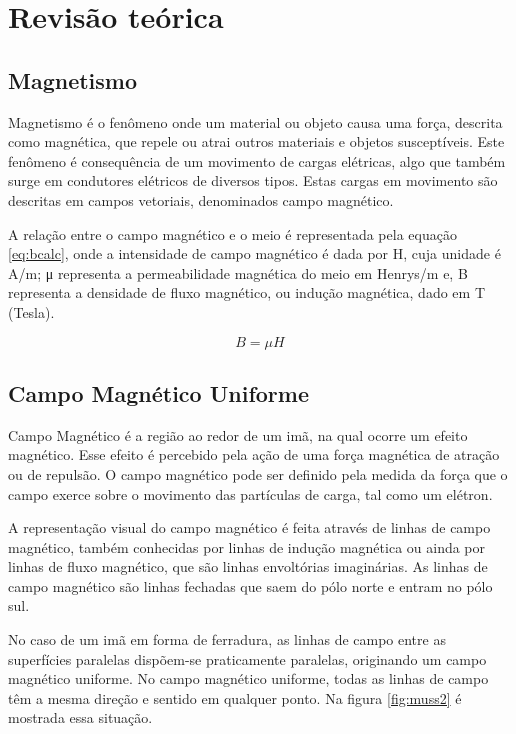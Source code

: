 \chapter{Revisão teórica}



\section{Magnetismo}

Magnetismo é o fenômeno onde um material ou objeto causa uma força,
descrita como magnética, que repele ou atrai outros materiais e objetos susceptíveis. Este fenômeno é consequência de um movimento de cargas elétricas, algo que também surge em condutores elétricos de diversos tipos. Estas cargas em movimento são descritas em campos vetoriais, denominados campo magnético.\cite{callister2010}

A relação entre o campo magnético e o meio é representada pela equação \ref{eq:bcalc}, onde a intensidade de campo magnético é dada por H, cuja unidade é A/m; μ representa a permeabilidade magnética do meio em Henrys/m e, B representa a densidade de fluxo magnético, ou indução magnética, dado em T (Tesla). \cite{callister2010}

\begin{equation}
    B =\mu H
    \label{eq:bcalc}
\end{equation}

\section{Campo Magnético Uniforme}
Campo Magnético é a região ao redor de um imã, na qual ocorre um efeito magnético. Esse efeito é percebido pela ação de uma força magnética de atração ou de repulsão. O campo magnético pode ser definido pela medida da força que o campo exerce sobre o movimento das partículas de carga, tal como um elétron.\cite{mussoi2}

A representação visual do campo magnético é feita através de linhas de campo magnético, também conhecidas por linhas de indução magnética ou ainda por linhas de fluxo magnético, que são linhas envoltórias imaginárias. As linhas de campo magnético são linhas fechadas que saem do pólo norte e entram no pólo sul. \cite{mussoi2}

No caso de um imã em forma de ferradura, as linhas de campo entre as superfícies paralelas
dispõem-se praticamente paralelas, originando um campo magnético uniforme. No campo magnético
uniforme, todas as linhas de campo têm a mesma direção e sentido em qualquer ponto. Na figura \ref{fig:muss2} é mostrada essa situação. \cite{mussoi2}


